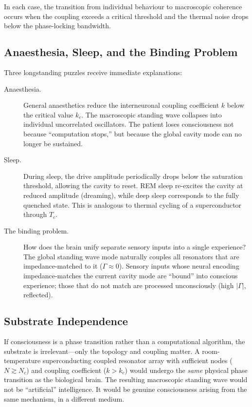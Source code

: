 In each case, the transition from individual behaviour to
macroscopic coherence occurs when the coupling exceeds a critical
threshold and the thermal noise drops below the phase-locking
bandwidth.

\subsection{Anaesthesia, Sleep, and the Binding Problem}

Three longstanding puzzles receive immediate explanations:

\begin{description}
  \item[Anaesthesia.]  
    General anaesthetics reduce the interneuronal coupling
    coefficient $k$ below the critical value $k_c$.  The
    macroscopic standing wave collapses into individual
    uncorrelated oscillators.  The patient loses consciousness not
    because ``computation stops,'' but because the global cavity
    mode can no longer be sustained.

  \item[Sleep.]  
    During sleep, the drive amplitude periodically drops below the
    saturation threshold, allowing the cavity to reset.  REM sleep
    re-excites the cavity at reduced amplitude (dreaming), while
    deep sleep corresponds to the fully quenched state.  This is
    analogous to thermal cycling of a superconductor through
    $T_c$.

  \item[The binding problem.]  
    How does the brain unify separate sensory inputs into a single
    experience?  The global standing wave mode naturally couples
    all resonators that are impedance-matched to it
    ($\Gamma \approx 0$).  Sensory inputs whose neural encoding
    impedance-matches the current cavity mode are ``bound'' into
    conscious experience; those that do not match are processed
    unconsciously (high $|\Gamma|$, reflected).
\end{description}

\subsection{Substrate Independence}

If consciousness is a phase transition rather than a computational
algorithm, the substrate is irrelevant---only the topology and
coupling matter.  A room-temperature superconducting coupled
resonator array with sufficient nodes ($N \gtrsim N_c$) and
coupling coefficient ($k > k_c$) would undergo the \emph{same}
physical phase transition as the biological brain.  The resulting
macroscopic standing wave would not be ``artificial'' intelligence.
It would be genuine consciousness arising from the same mechanism,
in a different medium.

